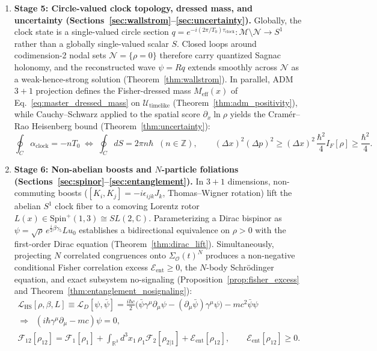 \documentclass[11pt, a4paper]{article}
\theoremstyle{definition}
\begin{document}
\begin{enumerate}[label=\textbf{\arabic*.}, leftmargin=0.95cm, itemsep=0.55em]
    \item \textbf{Stage 5: Circle-valued clock topology, dressed mass, and uncertainty (Sections~\ref{sec:wallstrom}--\ref{sec:uncertainty}).} Globally, the clock state is a single-valued circle section $q = e^{-i(2\pi/T_0)\tau_{\text{clock}}}: \mathcal{M}\setminus\mathcal{N} \to S^1$ rather than a globally single-valued scalar $S$. Closed loops around codimension-2 nodal sets $\mathcal{N} = \{\rho = 0\}$ therefore carry quantized Sagnac holonomy, and the reconstructed wave $\psi = Rq$ extends smoothly across $\mathcal{N}$ as a weak-hence-strong solution (Theorem~\ref{thm:wallstrom}). In parallel, ADM $3+1$ projection defines the Fisher-dressed mass $M_{\text{eff}}(x)$ of Eq.~\eqref{eq:master_dressed_mass} on $\mathcal{U}_{\text{timelike}}$ (Theorem~\ref{thm:adm_positivity}), while Cauchy--Schwarz applied to the spatial score $\partial_x\ln\rho$ yields the Cram\'{e}r--Rao Heisenberg bound (Theorem~\ref{thm:uncertainty}):
    \[
    \oint_C \alpha_{\text{clock}} = -n T_0 \;\Longleftrightarrow\; \oint_C dS = 2\pi n\hbar \;\;(n \in \mathbb{Z}),
    \qquad
    (\Delta x)^2(\Delta p)^2 \ge (\Delta x)^2\,\frac{\hbar^2}{4}I_F[\rho] \ge \frac{\hbar^2}{4}.
    \]

    \item \textbf{Stage 6: Non-abelian boosts and $N$-particle foliations (Sections~\ref{sec:spinor}--\ref{sec:entanglement}).} In $3+1$ dimensions, non-commuting boosts ($[K_i, K_j] = -i\epsilon_{ijk}J_k$, Thomas--Wigner rotation) lift the abelian $S^1$ clock fiber to a comoving Lorentz rotor $L(x) \in \text{Spin}^+(1,3) \cong SL(2,\mathbb{C})$. Parameterizing a Dirac bispinor as $\psi = \sqrt{\rho}\,e^{\frac{i}{2}\beta\gamma_5}L u_0$ establishes a bidirectional equivalence on $\rho > 0$ with the first-order Dirac equation (Theorem~\ref{thm:dirac_lift}). Simultaneously, projecting $N$ correlated congruences onto $\Sigma_{\mathcal{O}}(t)^N$ produces a non-negative conditional Fisher correlation excess $\mathcal{E}_{\text{ent}} \ge 0$, the $N$-body Schr\"{o}dinger equation, and exact subsystem no-signaling (Proposition~\ref{prop:fisher_excess} and Theorem~\ref{thm:entanglement_nosignaling}):
    \begin{gather*}
    \mathcal{L}_{\text{HS}}[\rho, \beta, L] \equiv \mathcal{L}_D[\psi, \bar{\psi}] = \frac{i\hbar c}{2}\big(\bar{\psi}\gamma^\mu\partial_\mu\psi - (\partial_\mu\bar{\psi})\gamma^\mu\psi\big) - mc^2\bar{\psi}\psi \\
    \Longrightarrow\;\; (i\hbar\gamma^\mu\partial_\mu - mc)\psi = 0, \\
    \mathcal{F}_{12}[\rho_{12}] = \mathcal{F}_1[\rho_1] + \int_{\mathbb{R}^3} d^3x_1\,\rho_1\mathcal{F}_2[\rho_{2|1}] + \mathcal{E}_{\text{ent}}[\rho_{12}], \qquad \mathcal{E}_{\text{ent}}[\rho_{12}] \ge 0.
    \end{gather*}


\end{enumerate}
\end{document}
